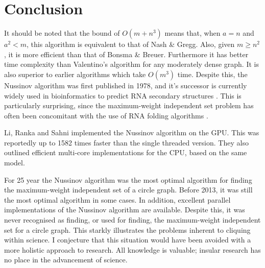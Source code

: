 \documentclass[12pt, a4paper]{article}
\begin{document}
\section*{Conclusion}
It should be noted that the bound of $O(m + n^3)$ means that, when $a = n$ and $a^2 < m$, this algorithm is equivalent to that of Nash \& Gregg. Also, given $m \geq n^2$, it is more efficient than that of Bonsma \& Breuer. Furthermore it has better time complexity than Valentino's algorithm for any moderately dense graph. It is also superior to earlier algorithms which take $O(m^3)$ time. Despite this, the Nussinov algorithm was first published in 1978, and it's successor is currently widely used in bioinformatics to predict RNA secondary structures \cite{lorenz2011viennarna}. This is particularly surprising, since the maximum-weight independent set problem has often been concomitant with the use of RNA folding algorithms \cite{sperschneider2008knotseeker, bon2011tt2ne}.

Li, Ranka and Sahni \cite{li2013multicore} implemented the Nussinov algorithm on the GPU. This was reportedly up to 1582 times faster than the single threaded version. They also outlined efficient multi-core implementations for the CPU, based on the same model.

For 25 year the Nussinov algorithm was the most optimal algorithm for finding the maximum-weight independent set of a circle graph. Before 2013, it was still the most optimal algorithm in some cases. In addition, excellent parallel implementations of the Nussinov algorithm are available. Despite this, it was never recognised as finding, or used for finding, the maximum-weight independent set for a circle graph. This starkly illustrates the problems inherent to cliquing within science. I conjecture that this situation would have been avoided with a more holistic approach to research. All knowledge is valuable; insular research has no place in the advancement of science.




\end{document}
